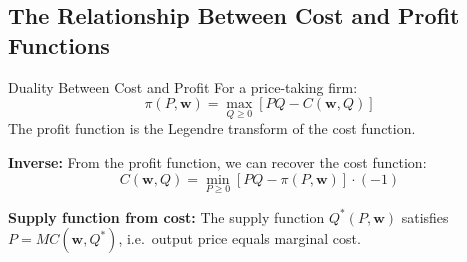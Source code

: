 \documentclass[12pt, a4paper]{article}
\theoremstyle{definition}
\begin{document}
\subsection{The Relationship Between Cost and Profit Functions}

\begin{thmbox}{Duality Between Cost and Profit}
For a price-taking firm:
\[
  \pi(P,\mathbf{w})
  = \max_{Q\geq 0}\left[PQ - C(\mathbf{w},Q)\right]
\]
The profit function is the Legendre transform of the cost function.

\textbf{Inverse:} From the profit function, we can recover the cost function:
\[
  C(\mathbf{w},Q) = \min_{P\geq 0}\left[PQ - \pi(P,\mathbf{w})\right] \cdot(-1)
\]

\textbf{Supply function from cost:}
The supply function $Q^*(P,\mathbf{w})$ satisfies
$P = MC(\mathbf{w},Q^*)$, i.e.\ output price equals marginal cost.
\end{thmbox}
\end{document}
